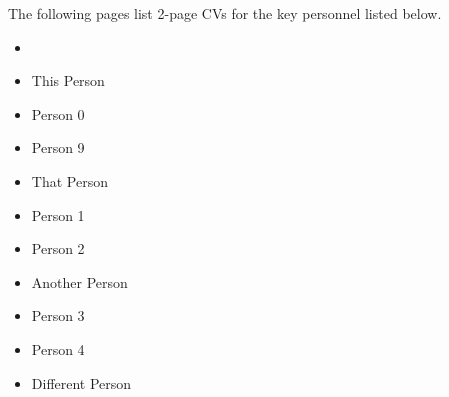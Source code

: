 
The following pages list 2-page CVs for the key personnel listed below.

\begin{itemize} \zapspace
    \item{\Investigator}
    \item{This Person} 
    \item{Person 0} 
    \item{Person 9} 
    \item{That Person} 
    \item{Person 1} 
    \item{Person 2} 
    \item{Another Person} 
    \item{Person 3} 
    \item{Person 4} 
    \item{Different Person} 
\end{itemize}

\newpage





